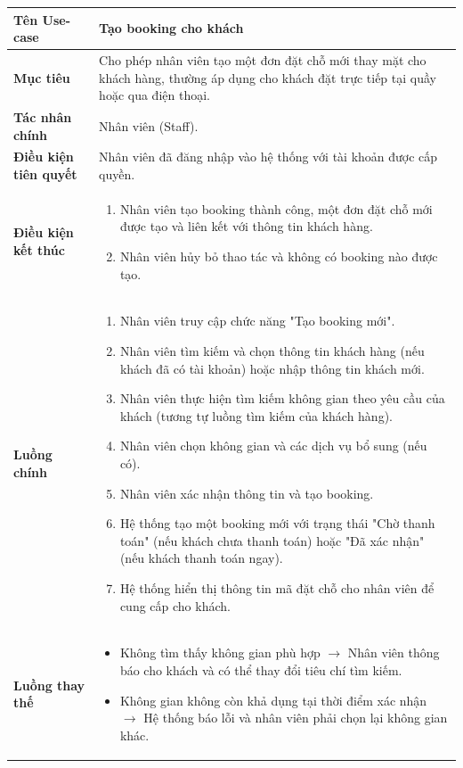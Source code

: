 \begin{table}[H]
\centering
\renewcommand{\arraystretch}{1.3}
\begin{tabular}{|p{4cm}|p{10cm}|}
\hline
\textbf{Tên Use-case} 
& Tạo booking cho khách \\ 
\hline

\textbf{Mục tiêu} 
& Cho phép nhân viên tạo một đơn đặt chỗ mới thay mặt cho khách hàng, thường áp dụng cho khách đặt trực tiếp tại quầy hoặc qua điện thoại. \\ 
\hline

\textbf{Tác nhân chính} 
& Nhân viên (Staff). \\ 
\hline

\textbf{Điều kiện tiên quyết} 
& Nhân viên đã đăng nhập vào hệ thống với tài khoản được cấp quyền. \\ 
\hline

\textbf{Điều kiện kết thúc} 
&
\begin{enumerate}
\item Nhân viên tạo booking thành công, một đơn đặt chỗ mới được tạo và liên kết với thông tin khách hàng.
\item Nhân viên hủy bỏ thao tác và không có booking nào được tạo.
\end{enumerate}
\\ 
\hline

\textbf{Luồng chính} 
& 
\begin{enumerate}
    \item Nhân viên truy cập chức năng "Tạo booking mới".
    \item Nhân viên tìm kiếm và chọn thông tin khách hàng (nếu khách đã có tài khoản) hoặc nhập thông tin khách mới.
    \item Nhân viên thực hiện tìm kiếm không gian theo yêu cầu của khách (tương tự luồng tìm kiếm của khách hàng).
    \item Nhân viên chọn không gian và các dịch vụ bổ sung (nếu có).
    \item Nhân viên xác nhận thông tin và tạo booking.
    \item Hệ thống tạo một booking mới với trạng thái "Chờ thanh toán" (nếu khách chưa thanh toán) hoặc "Đã xác nhận" (nếu khách thanh toán ngay).
    \item Hệ thống hiển thị thông tin mã đặt chỗ cho nhân viên để cung cấp cho khách.
\end{enumerate} \\ 
\hline

\textbf{Luồng thay thế} 
& 
\begin{itemize}
    \item Không tìm thấy không gian phù hợp $\rightarrow$ Nhân viên thông báo cho khách và có thể thay đổi tiêu chí tìm kiếm.
    \item Không gian không còn khả dụng tại thời điểm xác nhận $\rightarrow$ Hệ thống báo lỗi và nhân viên phải chọn lại không gian khác.
\end{itemize} \\ 
\hline


\end{tabular}
\end{table}
